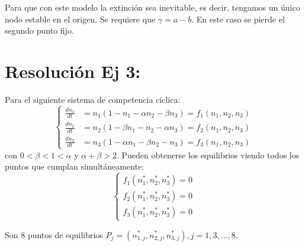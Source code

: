 \documentclass[twocolumn,aps,prl]{revtex4-1}
\newcommand{\nstar}{n^*}
\begin{document}


Para que con este modelo la extinción sea inevitable, es decir, tengamos un único nodo estable en el origen. Se requiere que $\gamma = a-b$. En este caso se pierde el segundo punto fijo.

% 
%                                 
% 

\section{Resolución Ej 3:}

Para el siguiente sistema de competencia cíclica:
$$
\left\{
\begin{aligned}
\frac{d n_{1}}{d t}&=n_{1}\left(1-n_{1}-\alpha n_{2}-\beta n_{3}\right) = f_1(n_1,n_2,n_3)\\
\frac{d n_{2}}{d t}&=n_{2}\left(1-\beta n_{1}-n_{2}-\alpha n_{3}\right) = f_2(n_1,n_2,n_3) \\
\frac{d n_{3}}{d t}&=n_{3}\left(1-\alpha n_{1}-\beta n_{2}-n_{3}\right) = f_3(n_1,n_2,n_3)
\end{aligned}
\right.
$$
con $0<\beta<1<\alpha$ y $\alpha+\beta>2$. Pueden obtenerse los  equilibrios viendo todos los puntos que cumplan simultáneamente: 
$$\left\lbrace
\begin{aligned}
    f_1(\nstar_1,\nstar_2,\nstar_3) = 0\\ 
    f_2(\nstar_1,\nstar_2,\nstar_3) = 0\\ 
    f_3(\nstar_1,\nstar_2,\nstar_3) = 0   
\end{aligned}\right.
$$


Son 8 puntos de equilibrios $P_j = (\nstar_{1,j},\nstar_{2,j},\nstar_{3,j}), j= 1, 3, ..., 8$.
\end{document}
